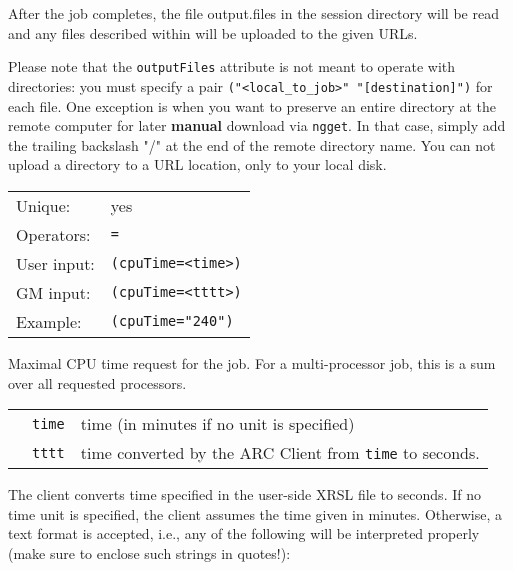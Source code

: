   After the job completes, the file output.files in the session
  directory will be read and any files described within will be
  uploaded to the given URLs.

  \begin{framed}
    Please note that the \texttt{outputFiles} attribute is not meant to
    operate with directories: you must specify a pair
    \verb#("<local_to_job>" "[destination]")# for each file. One
    exception is when you want to preserve an entire directory at the
    remote computer for later \textbf{manual} download via
    \texttt{ngget}. In that case, simply add the trailing backslash
    "/" at the end of the remote directory name. You can not upload a
    directory to a URL location, only to your local disk.
  \end{framed}

  \hspace*{0.5cm}
  \begin{shaded}
  \end{shaded}
  \begin{tabular}{lp{13cm}}
    Unique:&yes\\
    Operators:&\verb#=#\\
    User input:&\verb#(cpuTime=<time>)#\\
    GM input:&\verb#(cpuTime=<tttt>)#\\
    Example:&\verb#(cpuTime="240")#\\
  \end{tabular}

  Maximal CPU time request for the job. For a multi-processor job, this is a sum over all requested processors.

  \begin{tabular}{llp{10cm}}
    \hspace*{1cm}&\texttt{time} & time (in minutes if no unit is specified)\\
    \hspace*{1cm}&\texttt{tttt} & time converted by the ARC Client from \texttt{time} to 
    seconds.\\
  \end{tabular}
  
  The client converts time specified in the user-side XRSL file to seconds. 
  If no time unit is specified, the client assumes the time given in minutes. 
  Otherwise, a text format is accepted, i.e., any of the following will be interpreted
  properly (make sure to enclose such strings in quotes!):

